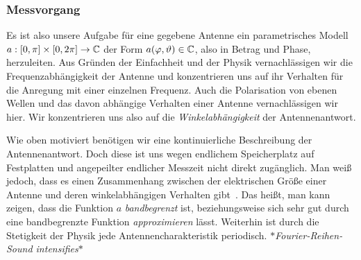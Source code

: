\subsubsection{Messvorgang}
%
%
Es ist also unsere Aufgabe f\"ur eine gegebene Antenne ein parametrisches Modell $a: [0, \pi] \times [0, 2\pi] \rightarrow \mathbb{C}$ der Form $a(\varphi, \vartheta) \in \mathbb{C}$, also in Betrag und Phase, herzuleiten. Aus Gr\"unden der Einfachheit und der Physik vernachl\"assigen wir die Frequenzabh\"angigkeit der Antenne und konzentrieren uns auf ihr Verhalten f\"ur die Anregung mit einer einzelnen Frequenz. Auch die Polarisation von ebenen Wellen und das davon abh\"angige Verhalten einer Antenne vernachl\"assigen wir hier. Wir konzentrieren uns also auf die \emph{Winkelabh\"angigkeit} der Antennenantwort.

Wie oben motiviert ben\"otigen wir eine kontinuierliche Beschreibung der Antennenantwort. Doch diese ist uns wegen endlichem Speicherplatz auf Festplatten und angepeilter endlicher Messzeit nicht direkt zug\"anglich. Man wei{\ss} jedoch, dass es einen Zusammenhang zwischen der elektrischen Gr\"o{\ss}e einer Antenne und deren winkelabh\"angigen Verhalten gibt~\cite[Kapitel~4]{delgaldo2007phd}. Das hei{\ss}t, man kann zeigen, dass die Funktion $a$ \emph{bandbegrenzt} ist, beziehungsweise sich sehr gut durch eine bandbegrenzte Funktion \emph{approximieren} l\"asst. Weiterhin ist durch die Stetigkeit der Physik jede Antennencharakteristik periodisch. \emph{$\ast$Fourier-Reihen-Sound intensifies$\ast$}

